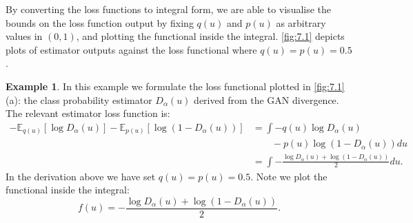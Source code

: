 \documentclass[honours,12pt]{unswthesis}
\newcommand{\E}{\mathbb{E}}
\numberwithin{equation}{section}
\theoremstyle{definition}
\newtheorem{example}[theorem]{Example}
\begin{document}
By converting the loss functions to integral form, we are able to visualise the bounds on the loss function output by fixing $q(u)$ and $p(u)$ as arbitrary values in $(0,1)$, and plotting the functional inside the integral. \autoref{fig:7.1} depicts plots of estimator outputs against the loss functional where $q(u)=p(u)=0.5$.
\begin{example}
In this example we formulate the loss functional plotted in \autoref{fig:7.1} (a): the class probability estimator $D_\alpha(u)$ derived from the GAN divergence. The relevant estimator loss function is:
\begin{align*}
-\E_{q(u)}[\log D_\alpha(u)]-\E_{p(u)}[\log (1-D_\alpha(u))]&=\int -q(u)\log D_\alpha(u)\\
&\quad \quad -p(u)\log(1-D_\alpha(u)) du\\
&=\int -\frac{\log D_\alpha(u)+\log(1-D_\alpha(u))}{2}du.
\end{align*}
In the derivation above we have set $q(u)=p(u)=0.5$. Note we plot the functional inside the integral:
\[f(u)=-\frac{\log D_\alpha(u)+\log(1-D_\alpha(u))}{2}.\]
\end{example}
\end{document}
